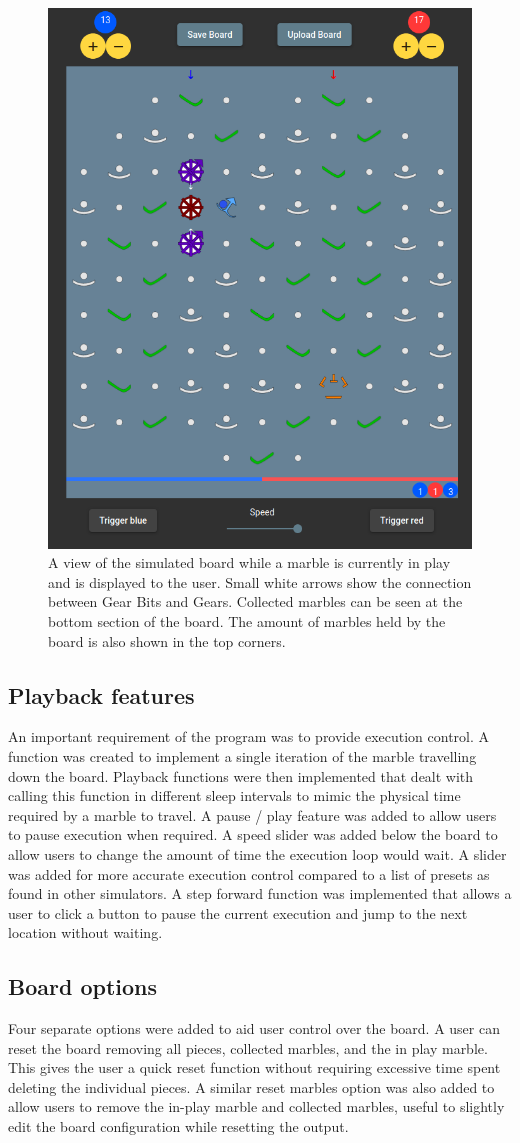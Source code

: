 \documentclass{l4proj}
\begin{document}
\begin{figure}
    \centering
    \includegraphics[width=0.5\linewidth]{images/marbleInPlay.png}
    \caption{A view of the simulated board while a marble is currently in play and is displayed to the user. Small white arrows show the connection between Gear Bits and Gears. Collected marbles can be seen at the bottom section of the board. The amount of marbles held by the board is also shown in the top corners.}
    \label{fig:marbleInPlay}
\end{figure}

\subsection{Playback features}
An important requirement of the program was to provide execution control. A function was created to implement a single iteration of the marble travelling down the board. Playback functions were then implemented that dealt with calling this function in different sleep intervals to mimic the physical time required by a marble to travel. A pause / play feature was added to allow users to pause execution when required. A speed slider was added below the board to allow users to change the amount of time the execution loop would wait. A slider was added for more accurate execution control compared to a list of presets as found in other simulators. A step forward function was implemented that allows a user to click a button to pause the current execution and jump to the next location without waiting. 

\subsection{Board options}
Four separate options were added to aid user control over the board. A user can reset the board removing all pieces, collected marbles, and the in play marble. This gives the user a quick reset function without requiring excessive time spent deleting the individual pieces. A similar reset marbles option was also added to allow users to remove the in-play marble and collected marbles, useful to slightly edit the board configuration while resetting the output.
\end{document}
